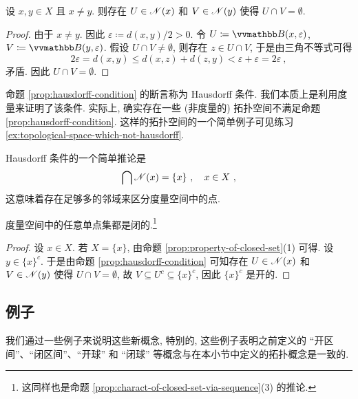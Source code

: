 \begin{proposition}[Hausdorff 条件]\label{prop:hausdorff-condition}
    设 \(x, y \in X\) 且 \(x \neq y\). 则存在 \(U \in \mathscr N(x)\) 和 \(V \in \mathscr N(y)\) 使得 \(U \cap V = \emptyset\).
\end{proposition}

\begin{proof}
    由于 \(x \neq y\). 因此 \(\varepsilon \coloneqq d(x, y) / 2 > 0\). 令 \(U \coloneqq \B(x, \varepsilon)\), \(V \coloneqq \B(y, \varepsilon)\). 假设 \(U \cap V \neq \emptyset\), 则存在 \(z \in U \cap V\), 于是由三角不等式可得
    \[
        2 \varepsilon = d(x, y) \leq d(x, z) + d(z, y) < \varepsilon + \varepsilon = 2 \varepsilon\ ,
    \]
    矛盾. 因此 \(U \cap V = \emptyset\).
\end{proof}

命题 \ref{prop:hausdorff-condition} 的断言称为 Hausdorff 条件. 我们本质上是利用度量来证明了该条件. 实际上, 确实存在一些 (非度量的) 拓扑空间不满足命题 \ref{prop:hausdorff-condition}. 这样的拓扑空间的一个简单例子可见练习 \ref{ex:topological-space-which-not-hausdorff}.

Hausdorff 条件的一个简单推论是
\[
    \bigcap \mathscr N(x) = \{x\}\ ,\quad x \in X\ ,
\]
这意味着存在足够多的邻域来区分度量空间中的点.

\begin{corollary}\label{cor:one-element-subset-is-closed}
    度量空间中的任意单点集都是闭的.\footnote{这同样也是命题 \ref{prop:charact-of-closed-set-via-sequence}(3) 的推论.}
\end{corollary}

\begin{proof}
    设 \(x \in X\). 若 \(X = \{x\}\), 由命题 \ref{prop:property-of-closed-set}(1) 可得. 设 \(y \in \{x\}^c\). 于是由命题 \ref{prop:hausdorff-condition} 可知存在 \(U \in \mathscr N(x)\) 和 \(V \in \mathscr N(y)\) 使得 \(U \cap V = \emptyset\), 故 \(V \subseteq U^c \subseteq \{x\}^c\), 因此 \(\{x\}^c\) 是开的.
\end{proof}

\subsection{例子}

我们通过一些例子来说明这些新概念, 特别的, 这些例子表明之前定义的 ``开区间''、``闭区间''、``开球'' 和 ``闭球'' 等概念与在本小节中定义的拓扑概念是一致的.

